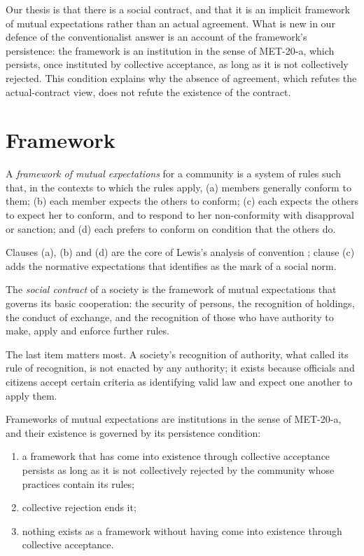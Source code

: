 \documentclass{situationist-preprint}
\begin{document}
Our thesis is that there is a social contract, and that it is an implicit framework of mutual expectations rather than an actual agreement. What is new in our defence of the conventionalist answer is an account of the framework's persistence: the framework is an institution in the sense of MET-20-a, which persists, once instituted by collective acceptance, as long as it is not collectively rejected. This condition explains why the absence of agreement, which refutes the actual-contract view, does not refute the existence of the contract.

\section{Framework}

\begin{definition}\label{d:framework}
A \emph{framework of mutual expectations} for a community is a system of rules such that, in the contexts to which the rules apply, (a) members generally conform to them; (b) each member expects the others to conform; (c) each expects the others to expect her to conform, and to respond to her non-conformity with disapproval or sanction; and (d) each prefers to conform on condition that the others do.
\end{definition}

Clauses (a), (b) and (d) are the core of Lewis's analysis of convention \citep{Lewis1969}; clause (c) adds the normative expectations that \citet{Bicchieri2006} identifies as the mark of a social norm.

\begin{definition}\label{d:contract}
The \emph{social contract} of a society is the framework of mutual expectations that governs its basic cooperation: the security of persons, the recognition of holdings, the conduct of exchange, and the recognition of those who have authority to make, apply and enforce further rules.
\end{definition}

The last item matters most. A society's recognition of authority, what \citet[ch.~6]{Hart1961} called its rule of recognition, is not enacted by any authority; it exists because officials and citizens accept certain criteria as identifying valid law and expect one another to apply them.

\begin{assumption}[Persistence]\label{a:persist}
Frameworks of mutual expectations are institutions in the sense of MET-20-a, and their existence is governed by its persistence condition:
\begin{enumerate}[label=(\alph*)]
\item a framework that has come into existence through collective acceptance persists as long as it is not collectively rejected by the community whose practices contain its rules;
\item collective rejection ends it;
\item nothing exists as a framework without having come into existence through collective acceptance.
\end{enumerate}
\end{assumption}
\end{document}
